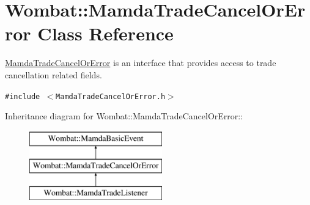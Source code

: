 \hypertarget{classWombat_1_1MamdaTradeCancelOrError}{
\section{Wombat::Mamda\-Trade\-Cancel\-Or\-Error Class Reference}
\label{classWombat_1_1MamdaTradeCancelOrError}
}
\hyperlink{classWombat_1_1MamdaTradeCancelOrError}{Mamda\-Trade\-Cancel\-Or\-Error} is an interface that provides access to trade cancellation related fields.  


{\tt \#include $<$Mamda\-Trade\-Cancel\-Or\-Error.h$>$}

Inheritance diagram for Wombat::Mamda\-Trade\-Cancel\-Or\-Error::\begin{figure}[H]
\begin{center}
\leavevmode
\includegraphics[height=3cm]{classWombat_1_1MamdaTradeCancelOrError}
\end{center}
\end{figure}
